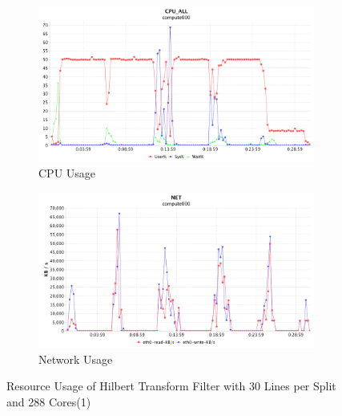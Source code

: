 \begin{figure}[!ht]
\centering
\begin{subfigure}{1\textwidth}
  \centering
  \includegraphics[width=1\linewidth]{figures/Htf30_288_CPU.png}
  \caption{CPU Usage}
  \label{Htf30_288_CPU}
\end{subfigure}
\begin{subfigure}{1\textwidth}
  \centering
  \includegraphics[width=1\linewidth]{figures/Htf30_288_NET.png}
  \caption{Network Usage}
  \label{Htf30_288_NET}
\end{subfigure}
\caption{Resource Usage of Hilbert Transform Filter with 30 Lines per Split and 288 Cores(1)}
\label{Htf30_288}
\end{figure}

